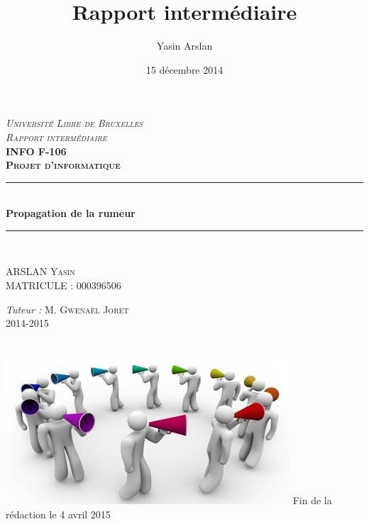 \documentclass[a4paper,11pt]{article}
\title{Rapport intermédiaire}
\author{Yasin Arslan}
\date{15 décembre 2014}
\newcommand{\HRule}{\rule{\linewidth}{0.5mm}}
\begin{document}
\begin{titlepage}
  \begin{sffamily}
  \begin{center}

    \textsc{\LARGE \textit{Université Libre de Bruxelles}}\\[0.3cm]
    \textsc{\LARGE \textit{Rapport intermédiaire}}\\[2cm]
    \textsc{\LARGE \textbf{INFO F-106}}\\[0.3cm]
    \textsc{\LARGE \textbf{Projet d'informatique}}\\[2cm]


    \HRule \\[0.4cm]
    { \huge \bfseries Propagation de la rumeur\\[0.4cm] }

    \HRule \\[2cm]

    \begin{minipage}{0.4\textwidth}
      \begin{flushleft} \large
        ARSLAN \textsc{Yasin}\\
        MATRICULE : \textsc{000396506}\\
      \end{flushleft}
    \end{minipage}
    \begin{minipage}{0.4\textwidth}
      \begin{flushright} \large
        \emph{Tuteur :} M. \textsc{Gwenaël Joret}\\
        \textsc{2014-2015}\\
      \end{flushright}
    \end{minipage}
    \\[2cm]
    \includegraphics{image.jpg}
    \vfill
    {\large Fin de la rédaction le 4 avril 2015}

  \end{center}
  \end{sffamily}
\end{titlepage}
\end{document}
